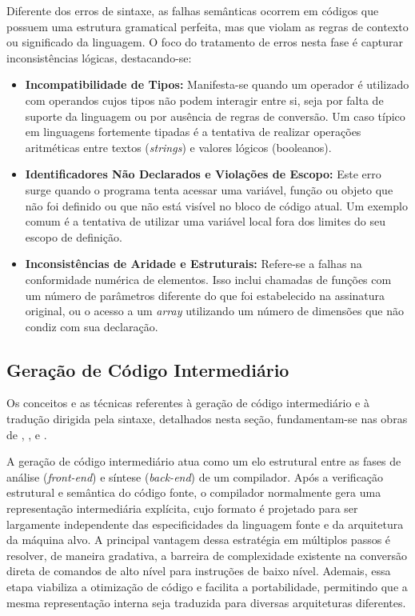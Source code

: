 Diferente dos erros de sintaxe, as falhas semânticas ocorrem em códigos que possuem uma estrutura gramatical perfeita, mas que violam as regras de contexto ou significado da linguagem. O foco do tratamento de erros nesta fase é capturar inconsistências lógicas, destacando-se:

\begin{itemize}
    \item \textbf{Incompatibilidade de Tipos:} Manifesta-se quando um operador é utilizado com operandos cujos tipos não podem interagir entre si, seja por falta de suporte da linguagem ou por ausência de regras de conversão. Um caso típico em linguagens fortemente tipadas é a tentativa de realizar operações aritméticas entre textos (\textit{strings}) e valores lógicos (booleanos).
    
    \item \textbf{Identificadores Não Declarados e Violações de Escopo:} Este erro surge quando o programa tenta acessar uma variável, função ou objeto que não foi definido ou que não está visível no bloco de código atual. Um exemplo comum é a tentativa de utilizar uma variável local fora dos limites do seu escopo de definição.
    
    \item \textbf{Inconsistências de Aridade e Estruturais:} Refere-se a falhas na conformidade numérica de elementos. Isso inclui chamadas de funções com um número de parâmetros diferente do que foi estabelecido na assinatura original, ou o acesso a um \textit{array} utilizando um número de dimensões que não condiz com sua declaração.
\end{itemize}

\subsection{Geração de Código Intermediário}

Os conceitos e as técnicas referentes à geração de código intermediário e à tradução dirigida pela sintaxe, detalhados nesta seção, fundamentam-se nas obras de , ,  e .

A geração de código intermediário atua como um elo estrutural entre as fases de análise (\textit{front-end}) e síntese (\textit{back-end}) de um compilador. Após a verificação estrutural e semântica do código fonte, o compilador normalmente gera uma representação intermediária explícita, cujo formato é projetado para ser largamente independente das especificidades da linguagem fonte e da arquitetura da máquina alvo. A principal vantagem dessa estratégia em múltiplos passos é resolver, de maneira gradativa, a barreira de complexidade existente na conversão direta de comandos de alto nível para instruções de baixo nível. Ademais, essa etapa viabiliza a otimização de código e facilita a portabilidade, permitindo que a mesma representação interna seja traduzida para diversas arquiteturas diferentes.

